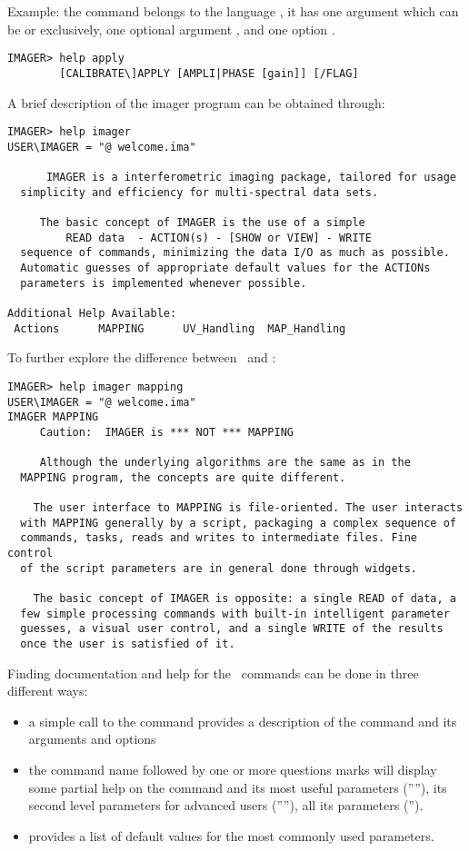 Example: the command  belongs to the language , 
it has one argument which can be  or  exclusively, 
one optional argument , and one option .
\begin{verbatim} 
IMAGER> help apply
        [CALIBRATE\]APPLY [AMPLI|PHASE [gain]] [/FLAG]
\end{verbatim} 

A brief description of the imager program can be obtained through:
\begin{verbatim} 
IMAGER> help imager
USER\IMAGER = "@ welcome.ima"
 
      IMAGER is a interferometric imaging package, tailored for usage
  simplicity and efficiency for multi-spectral data sets.
 
     The basic concept of IMAGER is the use of a simple
         READ data  - ACTION(s) - [SHOW or VIEW] - WRITE
  sequence of commands, minimizing the data I/O as much as possible.
  Automatic guesses of appropriate default values for the ACTIONs
  parameters is implemented whenever possible.
 
Additional Help Available:
 Actions      MAPPING      UV_Handling  MAP_Handling
\end{verbatim} 

To further explore the difference between \imager\ and \mapping :
\begin{verbatim} 
IMAGER> help imager mapping
USER\IMAGER = "@ welcome.ima"
IMAGER MAPPING
     Caution:  IMAGER is *** NOT *** MAPPING
 
     Although the underlying algorithms are the same as in the
  MAPPING program, the concepts are quite different.
 
    The user interface to MAPPING is file-oriented. The user interacts
  with MAPPING generally by a script, packaging a complex sequence of
  commands, tasks, reads and writes to intermediate files. Fine control
  of the script parameters are in general done through widgets.
 
    The basic concept of IMAGER is opposite: a single READ of data, a
  few simple processing commands with built-in intelligent parameter
  guesses, a visual user control, and a single WRITE of the results
  once the user is satisfied of it.
 \end{verbatim}
 
Finding documentation and help for the \imager\ commands can be done in three different ways:  
\begin{itemize}
\item a simple call to the  command provides a description of 
the command and its arguments and options
\item the command name followed by one or more questions marks will 
display some partial help on the command and its most useful 
parameters (''''), its second level parameters for advanced 
users (''''), all its parameters (''). 
\item {} provides a list of default values 
for the most commonly used parameters.
\end{itemize}

